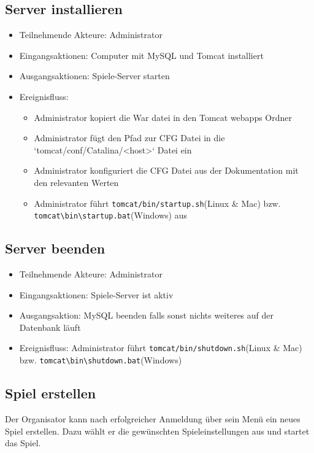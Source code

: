 \documentclass[a4paper]{scrreprt}
\begin{document}
    \subsection{Server installieren}
    \begin{itemize}
        \item Teilnehmende Akteure: \Gls{Administrator} 
        \item Eingangsaktionen: Computer mit MySQL und Tomcat installiert
        \item Ausgangsaktionen: Spiele-Server starten
        \item Ereignisfluss: 
            \begin{itemize}
                \item Administrator kopiert die War datei in den Tomcat webapps Ordner
                \item Administrator fügt den Pfad zur CFG Datei in die `tomcat/conf/Catalina/<host>` Datei ein
                \item Administrator konfiguriert die CFG Datei aus der Dokumentation mit den relevanten Werten
                \item Administrator führt \texttt{tomcat/bin/startup.sh}(Linux \& Mac) bzw. \texttt{tomcat\textbackslash bin\textbackslash startup.bat}(Windows) aus
            \end{itemize}
    \end{itemize}
    \subsection{Server beenden}
    \begin{itemize}
        \item Teilnehmende Akteure: Administrator
        \item Eingangsaktionen: Spiele-Server ist aktiv
        \item Ausgangsaktion: MySQL beenden falls sonst nichts weiteres auf der Datenbank läuft
        \item Ereignisfluss: Administrator führt \texttt{tomcat/bin/shutdown.sh}(Linux \& Mac) bzw. \texttt{tomcat\textbackslash bin\textbackslash shutdown.bat}(Windows)
    \end{itemize}
    \subsection{Spiel erstellen}
    Der \Gls{Organisator} kann nach erfolgreicher Anmeldung über sein Menü ein neues \Gls{Spiel} erstellen.
    Dazu wählt er die gewünschten \Gls{Spieleinstellungen} aus und startet das Spiel.
\end{document}
